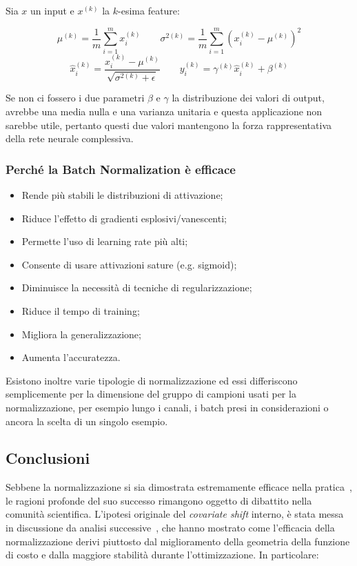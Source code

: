 Sia $x$ un input e $x^{(k)}$ la $k$-esima feature:

\begin{equation*}
    \mu^{(k)} = \frac{1}{m} \sum_{i=1}^m x_i^{(k)} \quad\quad \sigma^{2(k)} = \frac{1}{m} \sum_{i=1}^m (x_i^{(k)} - \mu^{(k)})^2
\end{equation*}
\begin{equation*}
    \hat{x}_i^{(k)} = \frac{x_i^{(k)} - \mu^{(k)}}{\sqrt{\sigma^{2(k)} + \epsilon}} \quad\quad y_i^{(k)} = \gamma^{(k)} \hat{x}_i^{(k)} + \beta^{(k)}
\end{equation*}

Se non ci fossero i due parametri $\beta$ e $\gamma$ la distribuzione dei valori di output, avrebbe una media nulla e una varianza unitaria e questa applicazione non sarebbe utile, pertanto questi due valori mantengono la forza rappresentativa della rete neurale complessiva.


\subsubsection{Perché la Batch Normalization è efficace}
\begin{itemize}
  \item Rende più stabili le distribuzioni di attivazione;
  \item Riduce l’effetto di gradienti esplosivi/vanescenti;
  \item Permette l’uso di learning rate più alti;
  \item Consente di usare attivazioni sature (e.g. sigmoid);
  \item Diminuisce la necessità di tecniche di regularizzazione;
  \item Riduce il tempo di training;
  \item Migliora la generalizzazione;
  \item Aumenta l'accuratezza.
\end{itemize}

Esistono inoltre varie tipologie di normalizzazione ed essi differiscono semplicemente per la dimensione del gruppo di campioni usati per la normalizzazione, per esempio lungo i canali, i batch presi in considerazioni o ancora la scelta di un singolo esempio.


\subsection{Conclusioni}

Sebbene la normalizzazione si sia dimostrata estremamente efficace nella pratica~\parencite{IoffeSzegedy2015BatchNorm}, le ragioni profonde del suo successo rimangono oggetto di dibattito nella comunità scientifica. L’ipotesi originale del \textit{covariate shift} interno, è stata messa in discussione da analisi successive~\parencite{Santurkar2018BNTheory}, che hanno mostrato come l’efficacia della normalizzazione derivi piuttosto dal miglioramento della geometria della funzione di costo e dalla maggiore stabilità durante l’ottimizzazione. In particolare:

